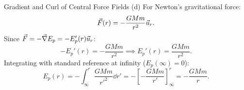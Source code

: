 \begin{workedexample}{Gradient and Curl of Central Force Fields}
(d) For Newton's gravitational force:
\[
\vec{F}(r) = -\frac{GMm}{r^2}\vec{u}_r.
\]
Since $\vec{F} = -\vec{\nabla} E_p = -E_p'(r)\vec{u}_r$:
\[
-E_p'(r) = -\frac{GMm}{r^2} \implies E_p'(r) = \frac{GMm}{r^2}.
\]
Integrating with standard reference at infinity ($E_p(\infty) = 0$):
\[
E_p(r) = -\int_\infty^r \frac{GMm}{r'^2}\dd r' = -\left[ -\frac{GMm}{r'} \right]_\infty^r = \boxed{-\frac{GMm}{r}.}
\]
\end{workedexample}
